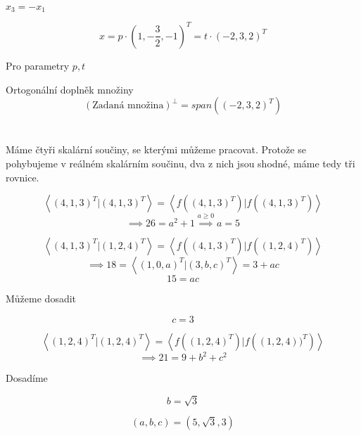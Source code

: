 \documentclass[10pt,a4paper]{article}
\theoremstyle{plain}
\theoremstyle{definition}
\begin{document}
$x_3 = -x_1$

\[ x = p \cdot (1,-\frac32,-1)^T = t \cdot (-2,3,2)^T \]

Pro parametry $p,t$

Ortogonální doplněk množiny \[(\text{Zadaná množina})^\perp = span((-2,3,2)^T )\]

\section{}

Máme čtyři skalární součiny, se kterými můžeme pracovat. Protože se pohybujeme v reálném skalárním součinu, dva z nich jsou shodné, máme tedy tři rovnice.

  
  \begin{equation}
\left\langle (4,1,3)^T|(4,1,3)^T\right\rangle = \left\langle f\left((4,1,3)^T\right)|f\left((4,1,3)^T\right)\right\rangle
\end{equation}
\[ \implies 26 = a^2 + 1 \overset{a \geq 0}{\implies} a = 5\]

\begin{equation}
\left\langle (4,1,3)^T|(1,2,4)^T \right\rangle = \left\langle f\left((4,1,3)^T\right)|f\left((1,2,4)^T\right)\right\rangle
\end{equation}
\[ \implies 18 = \left\langle (1,0,a)^T|(3,b,c)^T \right\rangle
= 3 + ac
 \]\[ 
  15 = ac\]
  
  Můžeme dosadit
  
  \[ c = 3 \]


  \begin{equation}
\left\langle (1,2,4)^T|(1,2,4)^T\right\rangle = \left\langle f\left((1,2,4)^T\right)|f\left((1,2,4))^T\right)\right\rangle
\end{equation}
\[ \implies 21 = 9 + b^2 + c^2 \]

Dosadíme

\[  b = \sqrt{3} \]

\[ (a,b,c) = (5, \sqrt{3}, 3)\]
\end{document}
